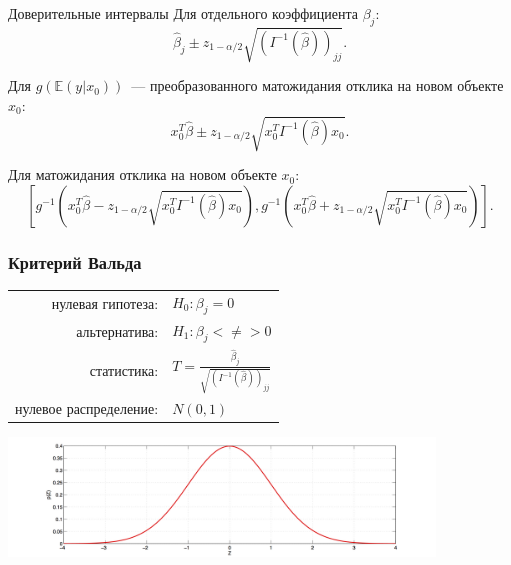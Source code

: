 \documentclass[9pt,pdf,utf8,hyperref={unicode},aspectratio=169]{beamer}
\begin{document}
\begin{frame}{Доверительные интервалы}
    Для отдельного коэффициента $\beta_j$:
    $$\hat{\beta}_j \pm z_{1-\alpha/2} \sqrt{\left(I^{-1} \left(\hat{\beta}\right)\right)_{jj}}.$$

    \bigskip

    Для $g\left(\mathbb{E}\left(y\left|x_0\right.\right)\right)$~--- преобразованного матожидания отклика на новом объекте $x_0$:
    $$x_0^T \hat{\beta} \pm z_{1-\alpha/2} \sqrt{x_0^T I^{-1}\left(\hat{\beta}\right) x_0}.$$

    \bigskip

    Для матожидания отклика на новом объекте $x_0$:
    $$\left[g^{-1}\left(x_0^T \hat{\beta} - z_{1-\alpha/2} \sqrt{x_0^T I^{-1}\left(\hat{\beta}\right) x_0}\right), 
            g^{-1}\left(x_0^T \hat{\beta} + z_{1-\alpha/2} \sqrt{x_0^T I^{-1}\left(\hat{\beta}\right) x_0}\right)\right].$$
\end{frame}

\begin{frame}
    \frametitle{Критерий Вальда}
    \begin{center}
        \begin{tabular}{rl}
            нулевая гипотеза:               & $H_0\colon \beta_j=0$ \\
            альтернатива:                   & $H_1\colon \beta_j<\neq>0$ \\
            статистика:                     & $T = \frac{\hat{\beta}_j}{ \sqrt{\left(I^{-1}\left(\hat{\beta}\right)\right)_{jj}} }$ \\
            нулевое распределение:          & $N(0,1)$\\
        \end{tabular}
        \includegraphics[width=0.85\textwidth]{norm.png}
    \end{center}
\end{frame}
\end{document}
